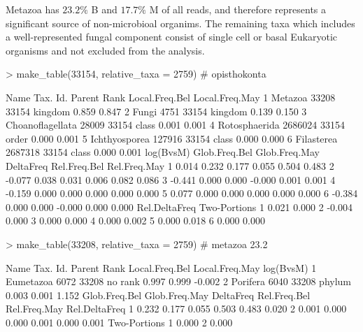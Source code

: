 \documentclass{article}
\begin{document}
Metazoa has  $23.2\%$ B and
$17.7\%$ M of all reads, and therefore represents a significant source of non-microbioal organims.
The remaining taxa which includes a well-represented fungal component consist of single cell or basal Eukaryotic organisms and not excluded from  the analysis.
\begin{Schunk}
\begin{Sinput}
> make_table(33154, relative_taxa = 2759) # opisthokonta  
\end{Sinput}
\begin{Soutput}
              Name Tax. Id. Parent    Rank Local.Freq.Bel Local.Freq.May
1          Metazoa    33208  33154 kingdom          0.859          0.847
2            Fungi     4751  33154 kingdom          0.139          0.150
3 Choanoflagellata    28009  33154   class          0.001          0.001
4    Rotosphaerida  2686024  33154   order          0.000          0.001
5    Ichthyosporea   127916  33154   class          0.000          0.000
6       Filasterea  2687318  33154   class          0.000          0.001
  log(BvsM) Glob.Freq.Bel Glob.Freq.May DeltaFreq Rel.Freq.Bel Rel.Freq.May
1     0.014         0.232         0.177     0.055        0.504        0.483
2    -0.077         0.038         0.031     0.006        0.082        0.086
3    -0.441         0.000         0.000    -0.000        0.001        0.001
4    -0.159         0.000         0.000     0.000        0.000        0.000
5     0.077         0.000         0.000     0.000        0.000        0.000
6    -0.384         0.000         0.000    -0.000        0.000        0.000
  Rel.DeltaFreq Two-Portions
1         0.021        0.000
2        -0.004        0.000
3         0.000        0.000
4         0.000        0.002
5         0.000        0.018
6         0.000        0.000
\end{Soutput}
\begin{Sinput}
> make_table(33208, relative_taxa = 2759) # metazoa 23.2% B and 17.7% M of all reads
\end{Sinput}
\begin{Soutput}
       Name Tax. Id. Parent    Rank Local.Freq.Bel Local.Freq.May log(BvsM)
1 Eumetazoa     6072  33208 no rank          0.997          0.999    -0.002
2  Porifera     6040  33208  phylum          0.003          0.001     1.152
  Glob.Freq.Bel Glob.Freq.May DeltaFreq Rel.Freq.Bel Rel.Freq.May Rel.DeltaFreq
1         0.232         0.177     0.055        0.503        0.483         0.020
2         0.001         0.000     0.000        0.001        0.000         0.001
  Two-Portions
1        0.000
2        0.000
\end{Soutput}
\end{Schunk}
\end{document}
